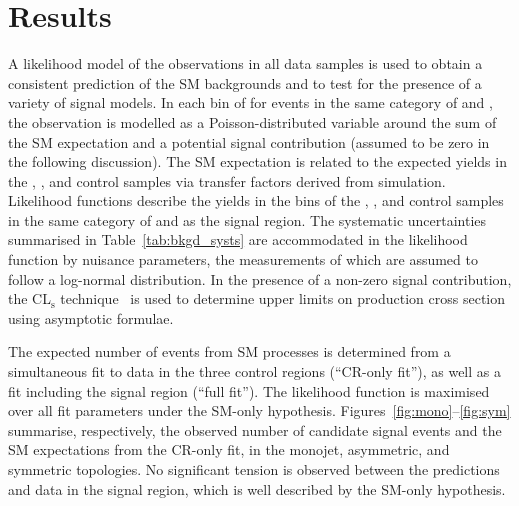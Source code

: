 \section{Results}
\label{sec:interpretation}

A likelihood model of the observations in all data samples is used to
obtain a consistent prediction of the SM backgrounds and to test for
the presence of a variety of signal models.  In each bin of \scalht
for events in the same category of \njet and \nb, the observation is
modelled as a Poisson-distributed variable around the sum of the SM
expectation and a potential signal contribution (assumed to be zero in
the following discussion). The SM expectation is related to the
expected yields in the \mj, \mmj, and \gj control samples via transfer
factors derived from simulation. Likelihood functions describe the
yields in the \scalht bins of the \mj, \mmj, and \gj control samples
in the same category of \njet and \nb as the signal region. The
systematic uncertainties summarised in Table~\ref{tab:bkgd_systs} are
accommodated in the likelihood function by nuisance parameters, the
measurements of which are assumed to follow a log-normal
distribution. In the presence of a non-zero signal contribution, the
CL$_{\mathrm{s}}$ technique~\cite{read, Cowan:2010js} is used to
determine upper limits on production cross section using asymptotic
formulae.

The expected number of events from SM processes is determined from a
simultaneous fit to data in the three control regions (``CR-only
fit''), as well as a fit including the signal region (``full
fit''). The likelihood function is maximised over all fit parameters
under the SM-only hypothesis.  Figures~\ref{fig:mono}--\ref{fig:sym}
summarise, respectively, the observed number of candidate signal
events and the SM expectations from the CR-only fit, in the monojet,
asymmetric, and symmetric topologies. No significant tension is
observed between the predictions and data in the signal region, which
is well described by the SM-only hypothesis.


